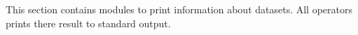 This section contains modules to print information about datasets.
All operators prints there result to standard output.
